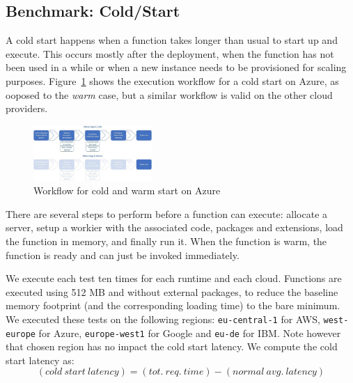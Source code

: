
\subsection{Benchmark: Cold/Start}
\label{sec:coldstart}
A cold start happens when a function takes longer than usual to start up and execute. 
This occurs mostly after the deployment, when the function has not been used in a while or when a new instance needs to be provisioned for scaling purposes. 
Figure~\ref{fig:azure_coldstart} shows the execution workflow for a cold start on Azure, as ooposed to the \emph{warm} case, but a similar workflow is valid on the other cloud providers.

\begin{figure}[htp]
\begin{center}
\includegraphics[width=0.4\textwidth]{bilder/azure-coldstart.jpeg}
\caption{Workflow for cold and warm start on Azure~\cite{AzureColdStart}}
\label{fig:azure_coldstart}
\end{center}
\end{figure}

There are several steps to perform before a function can execute: allocate a server, setup a workier with the associated code, packages and extensions, load the function in memory, and finally run it.
When the function is warm, the function is ready and can just be invoked immediately. 

We execute each test ten times for each runtime and each cloud. 
Functions are executed using 512 \gls{MB} and without external packages, to reduce the baseline memory footprint (and the corresponding loading time) to the bare minimum.
We executed these tests on the following regions: \texttt{eu-central-1} for AWS,  \texttt{west-europe} for Azure,  \texttt{europe-west1} for Google and \texttt{eu-de} for IBM. 
Note however that chosen region has no impact the cold start latency. 
We compute the cold start latency as:
\begin{equation*}
(cold\ start\ latency) = (tot.\ req.\ time) - (normal\ avg.\ latency)
\end{equation*}


